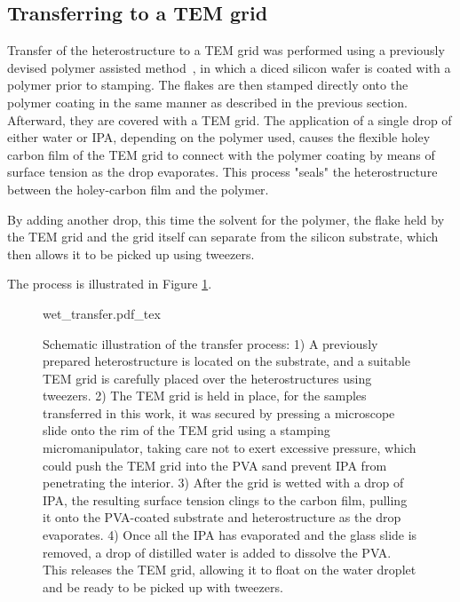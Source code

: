 \subsection{Transferring to a TEM grid}

Transfer of the heterostructure to a TEM grid was performed using a previously devised polymer assisted method~\cite{kosterPolymerassistedTEMSpecimen2021}, in which a diced silicon wafer is coated with a polymer prior to stamping.
%
The flakes are then stamped directly onto the polymer coating in the same manner as described in the previous section. Afterward, they are covered with a TEM grid. The application of a single drop of either water or IPA,  depending on the polymer used, causes the flexible holey carbon film of the TEM grid to connect with the polymer coating by means of surface tension as the drop evaporates. This process "seals" the heterostructure between the holey-carbon film and the polymer.

By adding another drop, this time the solvent for the polymer, the flake held by the TEM grid and the grid itself can separate from the silicon substrate, which then allows it to be picked up using tweezers.

The process is illustrated in Figure \ref{fig:wet_transfer}.

\begin{figure}[h]
	\centering
	\def\svgwidth{1\linewidth}
	{wet_transfer.pdf_tex}
	\caption{Schematic illustration of the transfer process: 1) A previously prepared heterostructure is located on the substrate, and a suitable TEM grid is carefully placed over the heterostructures using tweezers. 2) The TEM grid is held in place, for the samples transferred in this work, it was secured by pressing a microscope slide onto the rim of the TEM grid using a stamping micromanipulator, taking care not to exert excessive pressure, which could push the TEM grid into the PVA sand prevent IPA from penetrating the interior. 3) After the grid is wetted with a drop of IPA, the resulting surface tension clings to the carbon film, pulling it onto the PVA-coated substrate and heterostructure as the drop evaporates. 4) Once all the IPA has evaporated and the glass slide is removed, a drop of distilled water is added to dissolve the PVA. This releases the TEM grid, allowing it to float on the water droplet and be ready to be picked up with tweezers.}
	\label{fig:wet_transfer}
\end{figure}

